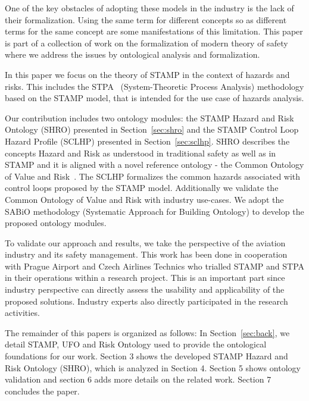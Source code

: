 \documentclass[sw]{iosart2x}
\newcommand{\sabio}[0]{SABiO}
\begin{document}
One of the key obstacles of adopting these models in the industry is the lack of their formalization. Using the same term for different concepts so as different terms for the same concept are some manifestations of this limitation. This paper is part of a collection of work on the formalization of modern theory of safety where we address the issues by ontological analysis and formalization. 

In this paper we focus on the theory of STAMP in the context of hazards and risks. This includes the STPA~\cite{leveson2012engineering} (System-Theoretic Process Analysis) methodology based on the STAMP model, that is intended for the use case of hazards analysis. 

Our contribution includes two ontology modules: the STAMP Hazard and Risk Ontology (SHRO) presented in Section~\ref{sec:shro} and the STAMP Control Loop Hazard Profile (SCLHP) presented in Section~\ref{sec:sclhp}. SHRO describes the concepts Hazard and Risk as understood in traditional safety as well as in STAMP and it is aligned with a novel reference ontology - the Common Ontology of Value and Risk~\cite{unknown}. The SCLHP formalizes the common hazards associated with control loops proposed by the STAMP model. Additionally we validate the Common Ontology of Value and Risk with industry use-cases. We adopt the \sabio{} methodology (Systematic Approach for Building Ontology) \cite{DeAlmeidaFalbo2014} to develop the proposed ontology modules. 

To validate our approach and results, we take the perspective of the aviation industry and its safety management. This work has been done in cooperation with Prague Airport and Czech Airlines Technics who trialled STAMP and STPA in their operations within a research project. This is an important part since industry perspective can directly assess the usability and applicability of the proposed solutions. Industry experts also directly participated in the research activities.

The remainder of this papers is organized as follows: In Section~\ref{sec:back}, we detail STAMP, UFO and Risk Ontology used to provide the ontological foundations for our work. Section 3 shows the developed STAMP Hazard and Risk Ontology (SHRO), which is analyzed in Section 4. Section 5 shows ontology validation and section 6 adds more details on the related work. Section 7 concludes the paper.

\end{document}
